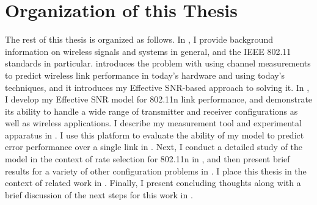 \section{Organization of this Thesis}
\label{sec:intro_organization}
The rest of this thesis is organized as follows. In , I provide background information on wireless signals and systems in general, and the IEEE 802.11 standards in particular.  introduces the problem with using channel measurements to predict wireless link performance in today's hardware and using today's techniques, and it introduces my Effective SNR-based approach to solving it. In , I develop my Effective SNR model for 802.11n link performance, and demonstrate its ability to handle a wide range of transmitter and receiver configurations as well as wireless applications. I describe my measurement tool and experimental apparatus in . I use this platform to evaluate the ability of my model to predict error performance over a single link in . Next, I conduct a detailed study of the model in the context of rate selection for 802.11n in , and then present brief results for a variety of other configuration problems in . I place this thesis in the context of related work in . Finally, I present concluding thoughts along with a brief discussion of the next steps for this work in .

\ifx\mainfile\undefined

\fi
